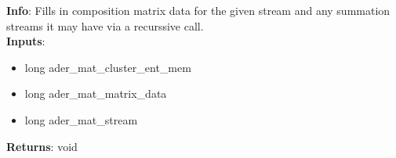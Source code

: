\textbf{Info}: Fills in composition matrix data for the given stream and any
summation streams it may have via a recurssive call. \\

\noindent \textbf{Inputs}:
\begin{itemize}
\item{long ader\_mat\_cluster\_ent\_mem}
\item{long ader\_mat\_matrix\_data}
\item{long ader\_mat\_stream}
\end{itemize}

\noindent \textbf{Returns}: void
